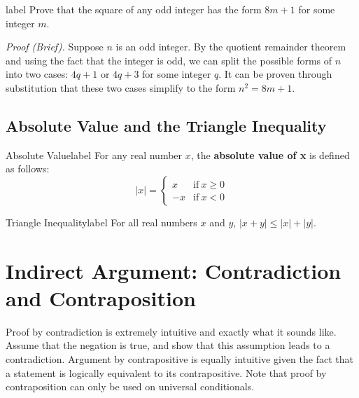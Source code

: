 \documentclass[a4paper]{report}
\begin{document}
\begin{example}{}{label}
    Prove that the square of any odd integer has the form $8m + 1$ for some integer $m$.
\end{example}

\emph{Proof (Brief).} Suppose $n$ is an odd integer. By the quotient remainder theorem and using the fact
that the integer is odd, we can split the possible forms of $n$ into two cases: $4q+1$ or $4q+3$ for
some integer $q$. It can be proven through substitution that these two cases simplify to the form
$n^2=8m+1$.

\subsection{Absolute Value and the Triangle Inequality}

\begin{definition}{Absolute Value}{label}
    For any real number $x$, the \textbf{absolute value of x} is defined as follows: 
    \begin{equation}
        |x| = 
        \begin{cases}
            x & \text{if} \: x \ge 0 \\
            -x & \text{if} \: x < 0
        \end{cases}
    \end{equation}
\end{definition}

\begin{theorem}{Triangle Inequality}{label}
    For all real numbers $x$ and  $y$, $|x + y|  \le  |x| + |y|$.
\end{theorem}

\section{Indirect Argument: Contradiction and Contraposition}

Proof by contradiction is extremely intuitive and exactly what it sounds like. Assume that the negation
is true, and show that this assumption leads to a contradiction. Argument by contrapositive is equally
intuitive given the fact that a statement is logically equivalent to its contrapositive. Note that
proof by contraposition can only be used on universal conditionals.
\end{document}
